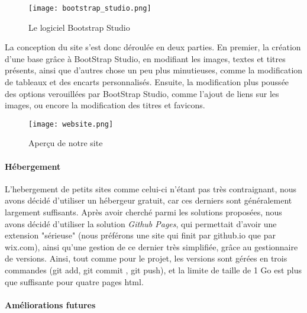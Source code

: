             \begin{figure}[hbt!]
                \centering
                \texttt{[image: bootstrap\_studio.png]}
                \caption{Le logiciel Bootstrap Studio}
            \end{figure}

            La conception du site s'est donc déroulée en deux parties. En premier, la création
            d'une base grâce à BootStrap Studio, en modifiant les images, textes et titres présents, ainsi
            que d'autres chose un peu plus minutieuses, comme la modification de tableaux et des encarts personnalisés.
            Ensuite, la modification plus poussée des options verouillées par BootStrap Studio, comme l'ajout de liens 
            sur les images, ou encore la modification des titres et favicons.

            \begin{figure}[hbt!]
                \centering
                \texttt{[image: website.png]}
                \caption{Aperçu de notre site}
            \end{figure}
            \FloatBarrier


        \paragraph{Hébergement}

            L'hebergement de petits sites comme celui-ci n'étant pas très contraignant,
            nous avons décidé d'utiliser un hébergeur gratuit, car ces derniers
            sont généralement largement suffisants. Après avoir cherché parmi les
            solutions proposées, nous avons décidé d'utiliser la solution 
            \textit{Github Pages}, qui permettait d'avoir une extension "sérieuse"
            (nous préférons une site qui finit par github.io que par wix.com),
            ainsi qu'une gestion de ce dernier très simplifiée, grâce au gestionnaire de versions.
            Ainsi, tout comme pour le projet, les versions sont gérées en trois commandes 
            (git add, git commit , git push), et la limite de taille de 1 Go est plus que suffisante pour quatre pages html. 
            

        
        \paragraph{Améliorations futures}

